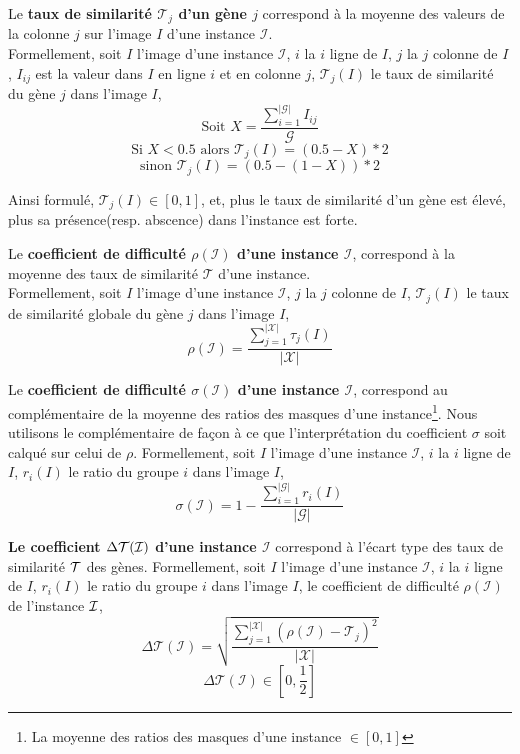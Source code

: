 \begin{definition}
Le \textbf{taux de similarité $\mathcal{T}_j$ d'un gène $j$} correspond à la moyenne des valeurs de la colonne $j$ sur l'image $I$ d'une instance $\mathcal{I}$.\\
Formellement, soit $I$ l'image d'une instance $\mathcal{I}$, $i$ la $i$ ligne de $I$, $j$ la $j$ colonne de $I$, $I_{ij}$ est la valeur dans $I$ en ligne $i$ et en colonne $j$, $\mathcal{T}_j(I)$ le taux de similarité du gène $j$ dans l'image $I$,
$$ \text{Soit } X=\frac{\sum_{i=1}^{|\mathcal{G}|} I_{ij}}{\mathcal{G}} $$ 
$$\text{Si } X<0.5 \text{ alors } \mathcal{T}_j(I)=(0.5-X)*2 $$
$$\text{sinon }\mathcal{T}_j(I)=(0.5-(1-X))*2$$ 
\end{definition}
Ainsi formulé, $\mathcal{T}_j(I) \in [0,1]$, et, plus le taux de similarité d'un gène est élevé, plus sa présence(resp. abscence) dans l'instance est forte.

\begin{definition}
Le \textbf{coefficient de difficulté $\rho(\mathcal{I})$ d'une instance $\mathcal{I}$}, correspond à la moyenne des taux de similarité $\mathcal{T}$ d'une instance.\\
Formellement, soit $I$ l'image d'une instance $\mathcal{I}$, $j$ la $j$ colonne de $I$, $\mathcal{T}_j(I)$ le taux de similarité globale du gène $j$ dans l'image $I$,
$$ \rho(\mathcal{I})=\frac{\sum_{j=1}^{|\mathcal{X}|}\tau_j(I)}{|\mathcal{X}|} $$
\end{definition}

\begin{definition}
Le \textbf{coefficient de difficulté $\sigma(\mathcal{I})$ d'une instance $\mathcal{I}$}, correspond au complémentaire de la moyenne des ratios des masques d'une instance\footnote{La moyenne des ratios des masques d'une instance $\in [0,1]$ }. Nous utilisons le complémentaire de façon à ce que l'interprétation du coefficient $\sigma$ soit calqué sur celui de $\rho$.
Formellement, soit $I$ l'image d'une instance $\mathcal{I}$, $i$ la $i$ ligne de $I$, $r_i(I)$ le ratio du groupe $i$ dans l'image $I$,
$$ \sigma(\mathcal{I})=1-\frac{\sum_{i=1}^{|\mathcal{G}|}r_i(I)} {|\mathcal{G}|} $$
\end{definition}

\begin{definition}
\textbf{Le coefficient $\Delta\cal{T}(\mathcal{I})$ d'une instance $\mathcal{I}$} correspond à l'écart type des taux de similarité $\cal{T}$ des gènes.
Formellement, soit $I$ l'image d'une instance $\mathcal{I}$, $i$ la $i$ ligne de $I$, $r_i(I)$ le ratio du groupe $i$ dans l'image $I$, le coefficient de difficulté $\rho(\mathcal{I})$ de l'instance $\cal{I}$, 
$$\Delta\mathcal{T}(\mathcal{I})=\sqrt{\frac{\sum_{j=1}^{|\mathcal{X}|} (\rho(\mathcal{I})-\mathcal{T}_j)^2}{|\mathcal{X}|}}$$
$$\Delta\mathcal{T}(\mathcal{I}) \in [0,\frac{1}{2}]$$
\end{definition}

